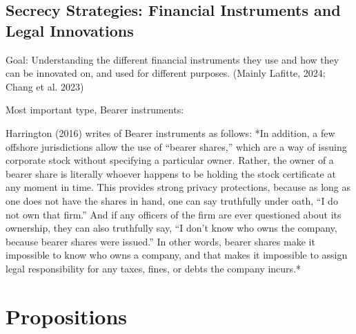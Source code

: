 \subsection{Secrecy Strategies: Financial Instruments and Legal Innovations}
\label{subsec:2_1_5}

Goal: Understanding the different financial instruments they use and how they can be innovated on, and used for different purposes. (Mainly Lafitte, 2024; Chang et al. 2023)


Most important type, Bearer instruments:

Harrington (2016) writes of Bearer instruments as follows:
*In addition, a few offshore jurisdictions allow the use of “bearer shares,” which are a way of issuing corporate stock without specifying a particular owner. Rather, the owner of a bearer share is literally whoever happens to be holding the stock certificate at any moment in time. This provides strong privacy protections, because as long as one does not have the shares in hand, one can say truthfully under oath, “I do not own that firm.” And if any officers of the firm are ever questioned about its ownership, they can also truthfully say, “I don’t know who owns the company, because bearer shares were issued.” In other words, bearer shares make it impossible to know who owns a company, and that makes it impossible to assign legal responsibility for any taxes, fines, or debts the company incurs.*


\section{Propositions}
\label{sec:2_2}



